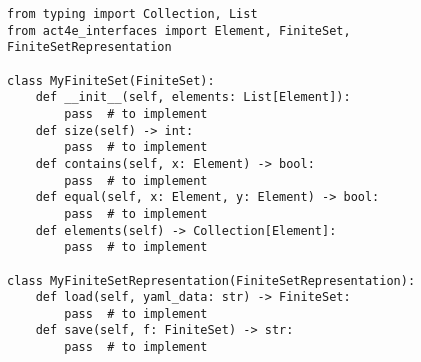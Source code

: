 \begin{minipage}{576pt}
\begin{verbatim}
from typing import Collection, List
from act4e_interfaces import Element, FiniteSet, FiniteSetRepresentation

class MyFiniteSet(FiniteSet):
    def __init__(self, elements: List[Element]):
        pass  # to implement
    def size(self) -> int:
        pass  # to implement
    def contains(self, x: Element) -> bool:
        pass  # to implement
    def equal(self, x: Element, y: Element) -> bool:
        pass  # to implement
    def elements(self) -> Collection[Element]:
        pass  # to implement

class MyFiniteSetRepresentation(FiniteSetRepresentation):
    def load(self, yaml_data: str) -> FiniteSet:
        pass  # to implement
    def save(self, f: FiniteSet) -> str:
        pass  # to implement
\end{verbatim}
\end{minipage}